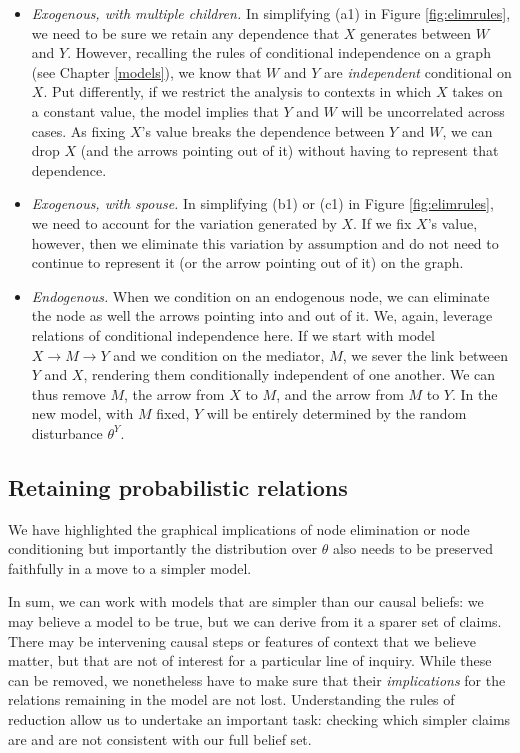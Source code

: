\documentclass[
  12pt,
]{book}
\providecommand{\tightlist}{%
  \setlength{\itemsep}{0pt}\setlength{\parskip}{0pt}}
\begin{document}
\begin{itemize}
\tightlist
\item
  \emph{Exogenous, with multiple children.} In simplifying (a1) in Figure \ref{fig:elimrules}, we need to be sure we retain any dependence that \(X\) generates between \(W\) and \(Y\). However, recalling the rules of conditional independence on a graph (see Chapter \ref{models}), we know that \(W\) and \(Y\) are \emph{independent} conditional on \(X\). Put differently, if we restrict the analysis to contexts in which \(X\) takes on a constant value, the model implies that \(Y\) and \(W\) will be uncorrelated across cases. As fixing \(X\)'s value breaks the dependence between \(Y\) and \(W\), we can drop \(X\) (and the arrows pointing out of it) without having to represent that dependence.
\item
  \emph{Exogenous, with spouse.} In simplifying (b1) or (c1) in Figure \ref{fig:elimrules}, we need to account for the variation generated by \(X\). If we fix \(X\)'s value, however, then we eliminate this variation by assumption and do not need to continue to represent it (or the arrow pointing out of it) on the graph.
\item
  \emph{Endogenous.} When we condition on an endogenous node, we can eliminate the node as well the arrows pointing into and out of it. We, again, leverage relations of conditional independence here. If we start with model \(X \rightarrow M \rightarrow Y\) and we condition on the mediator, \(M\), we sever the link between \(Y\) and \(X\), rendering them conditionally independent of one another. We can thus remove \(M\), the arrow from \(X\) to \(M\), and the arrow from \(M\) to \(Y\). In the new model, with \(M\) fixed, \(Y\) will be entirely determined by the random disturbance \(\theta^{Y}\).
\end{itemize}

\hypertarget{retaining-probabilistic-relations}{%
\subsection{Retaining probabilistic relations}\label{retaining-probabilistic-relations}}

We have highlighted the graphical implications of node elimination or node conditioning but importantly the distribution over \(\theta\) also needs to be preserved faithfully in a move to a simpler model.

In sum, we can work with models that are simpler than our causal beliefs: we may believe a model to be true, but we can derive from it a sparer set of claims. There may be intervening causal steps or features of context that we believe matter, but that are not of interest for a particular line of inquiry. While these can be removed, we nonetheless have to make sure that their \emph{implications} for the relations remaining in the model are not lost. Understanding the rules of reduction allow us to undertake an important task: checking which simpler claims are and are not consistent with our full belief set.
\end{document}
